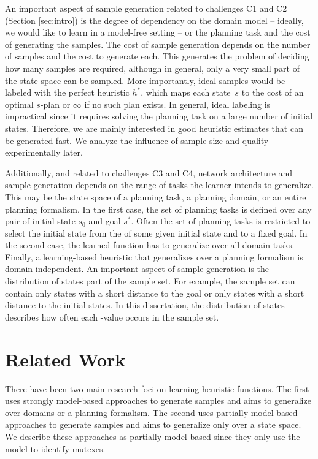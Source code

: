 An important aspect of sample generation related to challenges C1 and C2 (Section \ref{sec:intro}) is the degree of dependency on the domain model -- ideally, we would like to learn in a model-free setting -- or the planning task and the cost of generating the samples. The cost of sample generation depends on the number of samples and the cost to generate each. This generates the problem of deciding how many samples are required, although in general, only a very small part of the state space can be sampled. More importantly, ideal samples would be labeled with the perfect heuristic $h^*$, which maps each state~$s$ to the cost of an optimal $s$-plan or $\infty$ if no such plan exists. In general, ideal labeling is impractical since it requires solving the planning task on a large number of initial states. Therefore, we are mainly interested in good heuristic estimates that can be generated fast. We analyze the influence of sample size and quality experimentally later.

Additionally, and related to challenges C3 and C4, network architecture and sample generation depends on the range of tasks the learner intends to generalize. This may be the state space of a planning task, a planning domain, or an entire planning formalism. In the first case, the set of planning tasks is defined over any pair of initial state $s_0$ and goal $s^*$. Often the set of planning tasks is restricted to select the initial state from the \fssp of some given initial state and to a fixed goal. In the second case, the learned function has to generalize over all domain tasks. Finally, a learning-based heuristic that generalizes over a planning formalism is domain-independent. An important aspect of sample generation is the distribution of states part of the sample set. For example, the sample set can contain only states with a short distance to the goal or only states with a short distance to the initial states. In this dissertation, the distribution of states describes how often each \hstar-value occurs in the sample set.

\section{Related Work}
\label{sec:background_relatedwork}

There have been two main research foci on learning heuristic functions. The first uses strongly model-based approaches to generate samples and aims to generalize over domains or a planning formalism. The second uses partially model-based approaches to generate samples and aims to generalize only over a state space. We describe these approaches as partially model-based since they only use the model to identify mutexes.


